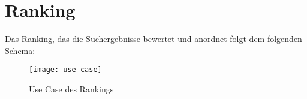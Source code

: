\author{Lothar Mödl, Gottfried von Recum}

\section{Ranking}

Das Ranking, das die Suchergebnisse bewertet und anordnet folgt dem folgenden Schema:

\begin{figure}[h]
	\centering
	\texttt{[image: use-case]}
	\caption{Use Case des Rankings}
	\label{fig:Ranking Use-Case}
\end{figure}
\pagebreak
